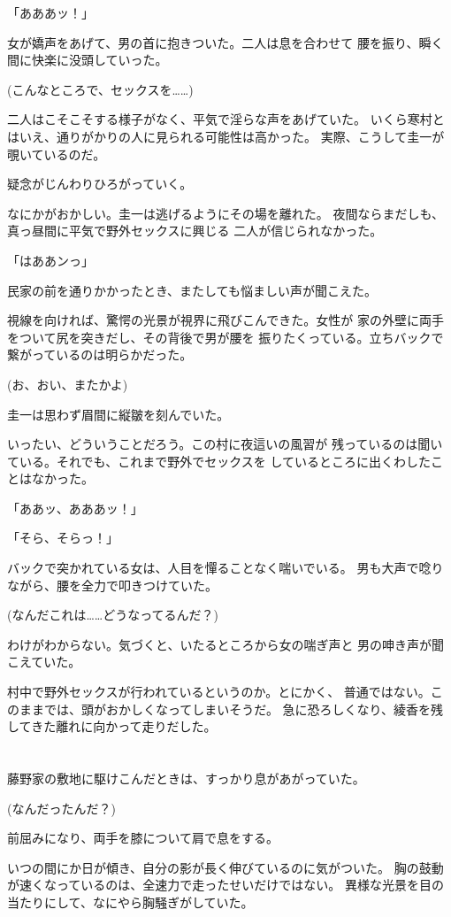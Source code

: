 ﻿\documentclass[
    book,tate,
    line_length=30zw,
    jafontsize=12pt,
    paper=b5j,
    landscape,
    ]{jlreq}
\begin{document}
「あああッ！」

女が嬌声をあげて、男の首に抱きついた。二人は息を合わせて
腰を振り、瞬く間に快楽に没頭していった。

(こんなところで、セックスを……)

二人はこそこそする様子がなく、平気で淫らな声をあげていた。
いくら寒村とはいえ、通りがかりの人に見られる可能性は高かった。
実際、こうして圭一が覗いているのだ。

疑念がじんわりひろがっていく。

なにかがおかしい。圭一は逃げるようにその場を離れた。
夜間ならまだしも、真っ昼間に平気で野外セックスに興じる
二人が信じられなかった。

「はああンっ」

民家の前を通りかかったとき、またしても悩ましい声が聞こえた。

視線を向ければ、驚愕の光景が視界に飛びこんできた。女性が
家の外壁に両手をついて尻を突きだし、その背後で男が腰を
振りたくっている。立ちバックで繋がっているのは明らかだった。

(お、おい、またかよ)

圭一は思わず眉間に縦皺を刻んでいた。

いったい、どういうことだろう。この村に夜這いの風習が
残っているのは聞いている。それでも、これまで野外でセックスを
しているところに出くわしたことはなかった。

「ああッ、あああッ！」

「そら、そらっ！」

バックで突かれている女は、人目を憚ることなく喘いでいる。
男も大声で唸りながら、腰を全力で叩きつけていた。

(なんだこれは……どうなってるんだ？)

わけがわからない。気づくと、いたるところから女の喘ぎ声と
男の呻き声が聞こえていた。

村中で野外セックスが行われているというのか。とにかく、
普通ではない。このままでは、頭がおかしくなってしまいそうだ。
急に恐ろしくなり、綾香を残してきた離れに向かって走りだした。

\section*{}

藤野家の敷地に駆けこんだときは、すっかり息があがっていた。

(なんだったんだ？)

前屈みになり、両手を膝について肩で息をする。

いつの間にか日が傾き、自分の影が長く伸びているのに気がついた。
胸の鼓動が速くなっているのは、全速力で走ったせいだけではない。
異様な光景を目の当たりにして、なにやら胸騒ぎがしていた。
\end{document}
